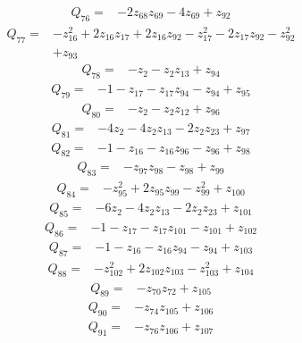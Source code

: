 \[\begin{aligned}Q_{76}={}&-2z_{68}z_{69}-4z_{69}+z_{92}
\end{aligned}\]
\[\begin{aligned}Q_{77}={}&-z_{16}^{2}+2z_{16}z_{17}+2z_{16}z_{92}-z_{17}^{2}-2z_{17}z_{92}-z_{92}^{2}
\\&+z_{93}
\end{aligned}\]
\[\begin{aligned}Q_{78}={}&-z_{2}-z_{2}z_{13}+z_{94}
\end{aligned}\]
\[\begin{aligned}Q_{79}={}&-1-z_{17}-z_{17}z_{94}-z_{94}+z_{95}
\end{aligned}\]
\[\begin{aligned}Q_{80}={}&-z_{2}-z_{2}z_{12}+z_{96}
\end{aligned}\]
\[\begin{aligned}Q_{81}={}&-4z_{2}-4z_{2}z_{13}-2z_{2}z_{23}+z_{97}
\end{aligned}\]
\[\begin{aligned}Q_{82}={}&-1-z_{16}-z_{16}z_{96}-z_{96}+z_{98}
\end{aligned}\]
\[\begin{aligned}Q_{83}={}&-z_{97}z_{98}-z_{98}+z_{99}
\end{aligned}\]
\[\begin{aligned}Q_{84}={}&-z_{95}^{2}+2z_{95}z_{99}-z_{99}^{2}+z_{100}
\end{aligned}\]
\[\begin{aligned}Q_{85}={}&-6z_{2}-4z_{2}z_{13}-2z_{2}z_{23}+z_{101}
\end{aligned}\]
\[\begin{aligned}Q_{86}={}&-1-z_{17}-z_{17}z_{101}-z_{101}+z_{102}
\end{aligned}\]
\[\begin{aligned}Q_{87}={}&-1-z_{16}-z_{16}z_{94}-z_{94}+z_{103}
\end{aligned}\]
\[\begin{aligned}Q_{88}={}&-z_{102}^{2}+2z_{102}z_{103}-z_{103}^{2}+z_{104}
\end{aligned}\]
\[\begin{aligned}Q_{89}={}&-z_{70}z_{72}+z_{105}
\end{aligned}\]
\[\begin{aligned}Q_{90}={}&-z_{74}z_{105}+z_{106}
\end{aligned}\]
\[\begin{aligned}Q_{91}={}&-z_{76}z_{106}+z_{107}
\end{aligned}\]
